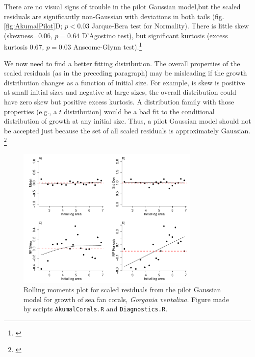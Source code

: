 \documentclass[11pt]{article}
\newcommand{\tom}[2]{{\color{red}{#1}}\footnote{\textit{\color{red}{#2}}}}
\begin{document}
{There are no visual signs of trouble in the pilot Gaussian model,but the scaled residuals are 
significantly non-Gaussian with deviations in both tails (fig. \ref{fig:AkumalPilot}D; $p<0.03$ Jarque-Bera test for Normality).
There is little skew (skewness=0.06, $p=0.64$ D'Agostino test), but significant kurtosis (excess kurtosis 0.67, $p=0.03$ 
Anscome-Glynn test).\tom{}{I wonder about advocating for use of these normality tests. It deviates a bit from the messaging to not rely too much on statistical tests, and also it is testing the normality of the marginal distribution of residuals, which for reasons we've discussed is not exactly what we want.} 

We now need to find a better fitting distribution. The overall properties of the scaled residuals (as in the preceding
paragraph) may be misleading if the growth distribution changes as a function of initial size. 
For example, is skew is positive at small initial sizes and negative at large sizes, the overall distribution 
could have zero skew but positive excess kurtosis. A distribution family with those properties (e.g., a $t$ distribution) 
would be a bad fit to the conditional distribution of growth at any initial size. Thus, a pilot Gaussian model should not
be accepted just because the set of all scaled residuals is approximately Gaussian. \tom{}{OK, as long as we have this qualifier than probably fine to include the tests. But it's also possible that stacking up many Gaussians can give a marginal distribution that is non-Gaussian.}

\begin{figure}[tbp]
\centering
\includegraphics[width=0.8\textwidth]{figures/AkumalRollingResiduals.pdf}
\caption{Rolling moments plot for scaled residuals from the pilot Gaussian model for growth of sea fan corals, \emph{Gorgonia ventalina}. 
Figure made by scripts \texttt{AkumalCorals.R} and \texttt{Diagnostics.R}.}
\label{fig:AkumalRollingResiduals}
\end{figure} 

}
\end{document}
